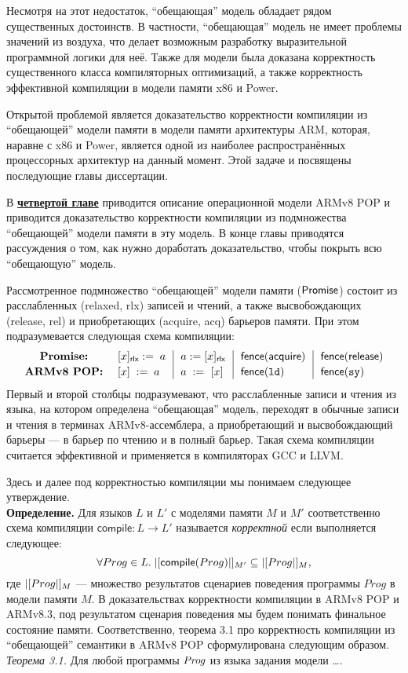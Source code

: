 Несмотря на этот недостаток, ``обещающая'' модель обладает рядом существенных достоинств.
В частности, ``обещающая'' модель не имеет проблемы значений из воздуха, что делает возможным разработку
выразительной программной логики для неё. Также для модели была доказана корректность существенного класса компиляторных
оптимизаций, а также корректность эффективной компиляции в модели памяти x86 и Power.

Открытой проблемой является доказательство корректности компиляции из ``обещающей'' модели памяти в модели памяти архитектуры
ARM, которая, наравне с x86 и Power, является одной из наиболее распространённых процессорных архитектур на данный момент.
Этой задаче и посвящены последующие главы диссертации.

В \underline{\textbf{четвертой главе}} приводится описание операционной модели ARMv8 POP и приводится доказательство
корректности компиляции из подмножества ``обещающей'' модели памяти в эту модель.
В конце главы приводятся рассуждения о том, как нужно доработать доказательство, чтобы покрыть всю ``обещающую'' модель.

Рассмотренное подмножество ``обещающей'' модели памяти ($\mathsf{Promise}$) состоит из расслабленных (relaxed, rlx) записей и чтений,
а также высвобождающих (release, rel) и приобретающих (acquire, acq) барьеров памяти. При этом подразумевается следующая
схема компиляции:
\[
  \begin{array}{c@{~~}@{~~}l@{~~}|@{~~}l@{~~}|@{~~}l@{~~}|@{~~}l}
    \textbf{Promise:}   & [x]_{\textsf{rlx}} := \; a & a := [x]_{\textsf{rlx}}  &  \acqFence & \relFence \\[2pt]
    \textbf{ARMv8 POP:} & \writeInst{x}{a}    & \readInst{a}{x}  &  \dmbLD & \dmbSY \\
  \end{array}
\]
Первый и второй столбцы подразумевают, что расслабленные записи и чтения из языка, на котором определена ``обещающая'' модель,
переходят в обычные записи и чтения в терминах ARMv8-ассемблера, а приобретающий и высвобождающий барьеры --- в барьер
по чтению и в полный барьер. Такая схема компиляции считается эффективной и применяется в компиляторах GCC и LLVM.

Здесь и далее под корректностью компиляции мы понимаем следующее утверждение.\\
\textbf{Определение.} Для языков $L$ и $L'$ с моделями памяти $M$ и $M'$ соответственно схема компиляции $\textsf{compile} : L \rightarrow L'$
называется \emph{корректной} если выполняется следующее:
\[ \forall Prog \in L. \; |[\textsf{compile}(Prog)|]_{M'} \subseteq |[Prog|]_{M}, \]
где $|[Prog|]_{M}$ --- множество результатов сценариев поведения программы $Prog$ в модели памяти $M$.
В доказательствах корректности компиляции в ARMv8 POP и ARMv8.3, под результатом сценария поведения мы будем
понимать финальное состояние памяти. Соответственно, теорема 3.1 про корректность компиляции из ``обещающей'' семантики в ARMv8 POP
сформулирована следующим образом. \\
\emph{Теорема 3.1.} Для любой программы $\mathit{Prog}$ из языка задания модели \dots.

